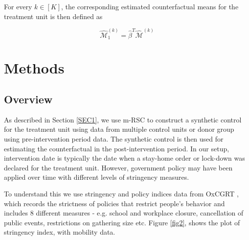 \documentclass[final,authoryear,5p,times,twocolumn]{elsarticle}
\begin{document}
	For every $k \in [K]$, the corresponding estimated counterfactual means for the treatment unit is then defined as
	
	\begin{equation*}
	\hat{\mathcal{M}}_1^{(k)} = \hat{\beta}^T \hat{\mathcal{M}}^{(k)}
	\end{equation*}
	
\section{Methods}
	\label{SEC3}
	\subsection{Overview}
	As described in Section \ref{SEC1}, we use m-RSC to construct a synthetic control for the treatment unit using data from multiple control units or donor group using pre-intervention period data.  The synthetic control is then used for estimating the counterfactual in the post-intervention period. In our setup, intervention date is typically the date when a stay-home order or lock-down was declared for the treatment unit.  However, government policy may have been applied over time with different levels of stringency measures. 
	
	To understand this we use stringency and policy indices data from OxCGRT \cite{HWP2020}, which records the strictness of policies that restrict people’s behavior and includes 8 different measures - e.g. school  and workplace closure, cancellation of public events, restrictions on gathering size etc. Figure \ref{fig2}, shows the plot of stringency index, with mobility data. 
\end{document}
